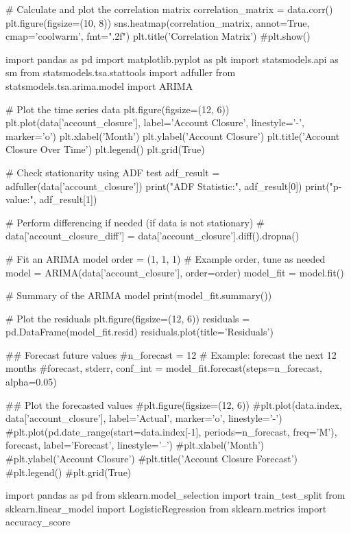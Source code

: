 # Calculate and plot the correlation matrix
correlation_matrix = data.corr()
plt.figure(figsize=(10, 8))
sns.heatmap(correlation_matrix, annot=True, cmap='coolwarm', fmt=".2f")
plt.title('Correlation Matrix')
#plt.show()






import pandas as pd
import matplotlib.pyplot as plt
import statsmodels.api as sm
from statsmodels.tsa.stattools import adfuller
from statsmodels.tsa.arima.model import ARIMA
 

# Plot the time series data
plt.figure(figsize=(12, 6))
plt.plot(data['account_closure'], label='Account Closure', linestyle='-', marker='o')
plt.xlabel('Month')
plt.ylabel('Account Closure')
plt.title('Account Closure Over Time')
plt.legend()
plt.grid(True)
 
# Check stationarity using ADF test
adf_result = adfuller(data['account_closure'])
print("ADF Statistic:", adf_result[0]) 
print("p-value:", adf_result[1])

# Perform differencing if needed (if data is not stationary)
# data['account_closure_diff'] = data['account_closure'].diff().dropna()

# Fit an ARIMA model
order = (1, 1, 1)  # Example order, tune as needed
model = ARIMA(data['account_closure'], order=order)
model_fit = model.fit()

 


# Summary of the ARIMA model
print(model_fit.summary())

# Plot the residuals
plt.figure(figsize=(12, 6))
residuals = pd.DataFrame(model_fit.resid)
residuals.plot(title='Residuals')
 
## Forecast future values
#n_forecast = 12  # Example: forecast the next 12 months
#forecast, stderr, conf_int = model_fit.forecast(steps=n_forecast, alpha=0.05)

## Plot the forecasted values
#plt.figure(figsize=(12, 6))
#plt.plot(data.index, data['account_closure'], label='Actual', marker='o', linestyle='-')
#plt.plot(pd.date_range(start=data.index[-1], periods=n_forecast, freq='M'), forecast, label='Forecast', linestyle='--')
#plt.xlabel('Month')
#plt.ylabel('Account Closure')
#plt.title('Account Closure Forecast')
#plt.legend()
#plt.grid(True)





import pandas as pd
from sklearn.model_selection import train_test_split
from sklearn.linear_model import LogisticRegression
from sklearn.metrics import accuracy_score

